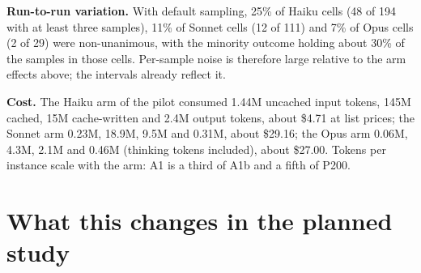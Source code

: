 \documentclass[10pt]{article}
\begin{document}
\begin{table}[t]
\centering\small
{}
\caption{Change in $\Delta$-pass when A1 is padded to the stated load, excluding instances the model solved from task text alone. $n$ is the number of instances with that arm built.}
\label{tab:curve}
\end{table}

\textbf{Run-to-run variation.} With default sampling, 25\% of Haiku cells (48 of 194 with at least three samples), 11\% of Sonnet cells (12 of 111) and 7\% of Opus cells (2 of 29) were non-unanimous, with the minority outcome holding about 30\% of the samples in those cells. Per-sample noise is therefore large relative to the arm effects above; the intervals already reflect it.

\textbf{Cost.} The Haiku arm of the pilot consumed 1.44M uncached input tokens, 145M cached, 15M cache-written and 2.4M output tokens, about \$4.71 at list prices; the Sonnet arm 0.23M, 18.9M, 9.5M and 0.31M, about \$29.16; the Opus arm 0.06M, 4.3M, 2.1M and 0.46M (thinking tokens included), about \$27.00. Tokens per instance scale with the arm: A1 is a third of A1b and a fifth of P200.

\section{What this changes in the planned study}
\end{document}
